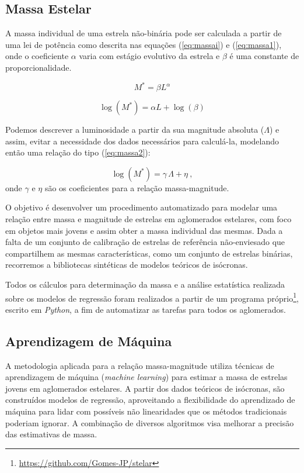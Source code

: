     \subsection{Massa Estelar}\label{sec:massa_estelar}
    A massa individual de uma estrela não-binária pode ser calculada a partir de uma lei de potência como descrita nas equações (\ref{eq:massai}) e (\ref{eq:massa1}), onde o coeficiente \(\alpha\) varia com estágio evolutivo da estrela e \(\beta\) é uma constante de proporcionalidade.
    
    \begin{equation}
    	\label{eq:massai}
    	M^* =  \beta L^\alpha
    \end{equation}
    
    \begin{equation}
    	\label{eq:massa1}
    	\log(M^*) =  \alpha L + \log(\beta)
    \end{equation}
    
    Podemos descrever a luminosidade a partir da sua magnitude absoluta (\(\Lambda\)) e assim, evitar a necessidade dos dados necessários para calculá-la, modelando então uma relação do tipo (\ref{eq:massa2}):
    
    \begin{equation}
    	\label{eq:massa2}
    	\log(M^*) =  \gamma \, \Lambda + \eta ~,
    \end{equation}
	onde \(\gamma\) e \(\eta\) são os coeficientes para a relação massa-magnitude.
    
    O objetivo é desenvolver um procedimento automatizado para modelar uma relação entre massa e magnitude de estrelas em aglomerados estelares, com foco em objetos mais jovens e assim obter a massa individual das mesmas. Dada a falta de um conjunto de calibração de estrelas de referência não-enviesado que compartilhem as mesmas características, como um conjunto de estrelas binárias, recorremos a bibliotecas sintéticas de modelos teóricos de isócronas.
    
    Todos os cálculos para determinação da massa e a análise estatística realizada sobre os modelos de regressão foram realizados a partir de um programa próprio\footnote{ \url{https://github.com/Gomes-JP/stelar}}, escrito em \textit{Python}, a fim de automatizar as tarefas para todos os aglomerados.  
    
    \subsection{Aprendizagem de Máquina}
    A metodologia aplicada para a relação massa-magnitude utiliza técnicas de aprendizagem de máquina (\textit{machine learning}) para estimar a massa de estrelas jovens em aglomerados estelares. A partir dos dados teóricos de isócronas, são construídos modelos de regressão, aproveitando a flexibilidade do aprendizado de máquina para lidar com possíveis não linearidades que os métodos tradicionais poderiam ignorar. A combinação de diversos algoritmos visa melhorar a precisão das estimativas de massa.
    
